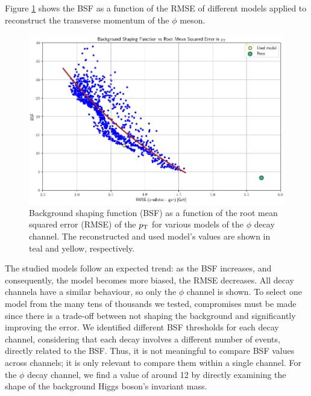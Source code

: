 \begin{myitemlist}
    Figure \ref{fig:BSF_vs_RMSE_phi} shows the BSF as a function of the RMSE of different models applied to reconstruct the transverse momentum of the $\phi$ meson.
    \begin{figure}[!ht]
        \captionsetup[subfigure]{labelformat=empty}
        \vspace*{-0.2cm}
        \centering
        \setlength{\mylength}{\textwidth}
        \includegraphics[width=0.85\mylength]{resources/plots/BSF_vs_RMSE_phi.png}
        \caption{Background shaping function (BSF) as a function of the root mean squared error (RMSE) of the $p_\text{T}$ for various models of the $\phi$ decay channel. The reconstructed and used model's values are shown in teal and yellow, respectively.}
        \label{fig:BSF_vs_RMSE_phi}
        \vspace*{-0.0cm}
    \end{figure}
    The studied models follow an expected trend: as the BSF increases, and consequently, the model becomes more biased, the RMSE decreases. All decay channela have a similar behaviour, so only the $\phi$ channel is shown. To select one model from the many tens of thousands we tested, compromises must be made since there is a trade-off between not shaping the background and significantly improving the error. We identified different BSF thresholds for each decay channel, considering that each decay involves a different number of events, directly related to the BSF. Thus, it is not meaningful to compare BSF values across channels; it is only relevant to compare them within a single channel. For the $\phi$ decay channel, we find a value of around 12 by directly examining the shape of the background Higgs boson's invariant mass.

\end{myitemlist}

